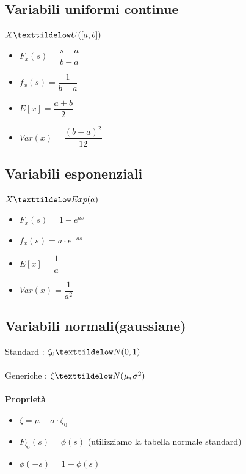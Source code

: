 \subsection{Variabili uniformi continue}
$X \texttildelow U([a, b])$ 
\begin{itemize}
	\item $F_{x}(s) = \dfrac{s - a}{b - a}$ 
	\item $f_{x}(s) = \dfrac{1}{b - a}$	
	\item $E[x] = \dfrac{a + b}{2}$
	\item $Var(x) = \dfrac{(b - a)^2}{12}$
\end{itemize}
\subsection{Variabili esponenziali}
$X \texttildelow Exp(a)$
\begin{itemize}
	\item $F_{x}(s) = 1 - e^{as}$ 
	\item $f_{x}(s) = a \cdot e^{-as}$	
	\item $E[x] = \dfrac{1}{a}$
	\item $Var(x) = \dfrac{1}{a^2}$
\end{itemize}
\newpage
\subsection{Variabili normali(gaussiane)}
Standard : $\zeta_0 \texttildelow N(0,1)$ \\ \\
Generiche : $\zeta \texttildelow N(\mu,\sigma^2)$ \\ \\
\textbf{Proprietà}
\begin{itemize}
	\item $\zeta = \mu + \sigma \cdot \zeta_0$
	\item $F_{\zeta_0}(s) = \phi(s)$ (utilizziamo la tabella normale standard)
	\item $\phi(-s) = 1 - \phi(s)$
\end{itemize}
